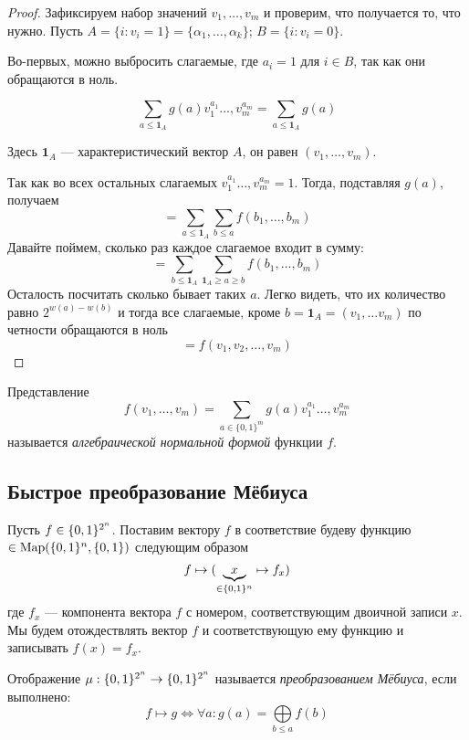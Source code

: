 \begin{proof}
Зафиксируем набор значений $v_1, \ldots, v_m$ и проверим, что получается то,
 что нужно. Пусть $A = \{i \colon v_i = 1\} = \{\alpha_1, \ldots, \alpha_k\};
 \, B = \{i \colon v_i = 0\}$.

Во-первых, можно выбросить слагаемые, где $a_i = 1$ для $i \in B$, так 
как они обращаются в ноль.

$$\sum\limits_{a \le \mathbf{1}_A} g(a) v_1^{a_1} \ldots, v_m^{a_m} = 
\sum\limits_{a \le \mathbf{1}_A} g(a)$$

{\scriptsize Здесь $\mathbf{1}_A$ --- характеристический вектор $A$, он
 равен $(v_1, \ldots, v_m)$.}

Так как во всех остальных слагаемых $v_1^{a_1} \ldots, v_m^{a_m} = 1$.
 Тогда, подставляя $g(a)$, получаем
$$=  \sum\limits_{a \le \mathbf{1}_A} \sum\limits_{b \le a} f(b_1, \ldots, b_m)$$
Давайте поймем, сколько раз каждое слагаемое входит в сумму:
$$ = \sum\limits_{b \le \mathbf{1}_A} \sum\limits_{\mathbf{1}_A \ge a \ge b}
 f(b_1, \ldots, b_m)$$
Осталость посчитать сколько бывает таких $a$. Легко видеть, что их
 количество равно $2^{w(a) - w(b)}$ и тогда все слагаемые, кроме 
 $b = \mathbf{1}_A = (v_1, \ldots v_m)$ по четности обращаются в ноль
$$ = f(v_1, v_2, \ldots, v_m)$$
\end{proof}



\begin{definition}
Представление
$$f(v_1, \ldots, v_m) = \sum\limits_{a \in \{0,1\}^m} g(a) v_1^{a_1}
 \ldots, v_m^{a_m}$$
 называется \emph{алгебраической нормальной формой} функции $f$.
\end{definition}

\subsection{Быстрое преобразование Мёбиуса}
\begin{definition}
Пусть $f \in \{0,1\}^{2^n}$. Поставим вектору $f$ в соответствие будеву функцию
$\in \operatorname*{Map}(\{0,1\}^n, \{0,1\})$ следующим образом
$$f \mapsto (\underbrace{x}_{\in \{0,1\}^n} \mapsto f_{x})$$
где $f_x$ --- компонента вектора $f$ с номером, соответствующим двоичной
записи $x$. Мы будем отождествлять вектор $f$ и соответствующую
ему функцию и записывать $f(x) = f_x$.

Отображение $\mu: \{0,1\}^{2^n} \to \{0,1\}^{2^n}$ называется 
\emph{преобразованием Мёбиуса}, если выполнено:
   $$f \mapsto g \iff \forall a \colon g(a) = \bigoplus\limits_{b \le a} f(b)$$
\end{definition}

